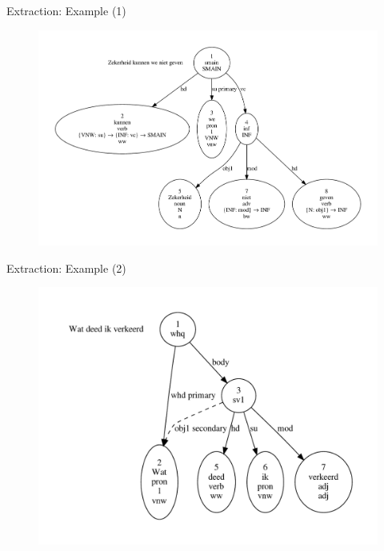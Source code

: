 \documentclass{beamer}
\begin{document}
{
\begin{frame}{Extraction: Example (1)}
	\begin{figure}
		\includegraphics[scale=0.38]{zekerheid2.pdf}
	\end{figure}
\end{frame}
}

{
\begin{frame}{Extraction: Example (2)}
	\begin{figure}
		\includegraphics[scale=0.5]{deed.pdf}
	\end{figure}
\end{frame}
}
\end{document}
